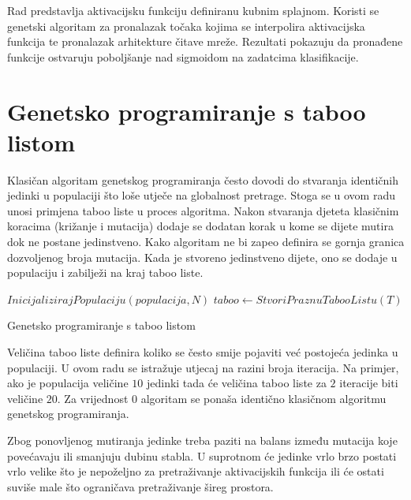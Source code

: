 \documentclass[times, utf8, numeric, diplomski]{fer}
\begin{document}
Rad \citet{cube_spline_func} predstavlja aktivacijsku funkciju definiranu kubnim splajnom. Koristi se genetski algoritam za pronalazak točaka kojima se interpolira aktivacijska funkcija te pronalazak arhitekture čitave mreže. Rezultati pokazuju da pronađene funkcije ostvaruju poboljšanje nad sigmoidom na zadatcima klasifikacije.

\section{Genetsko programiranje s taboo listom}
Klasičan algoritam genetskog programiranja često dovodi do stvaranja identičnih jedinki u populaciji što loše utječe na globalnost pretrage. Stoga se u ovom radu unosi primjena taboo liste u proces algoritma. Nakon stvaranja djeteta klasičnim koracima (križanje i mutacija) dodaje se dodatan korak u kome se dijete mutira dok ne postane jedinstveno. Kako algoritam ne bi zapeo definira se gornja granica dozvoljenog broja mutacija. Kada je stvoreno jedinstveno dijete, ono se dodaje u populaciju i zabilježi na kraj taboo liste.
\newline
\newline
\begin{algorithm}[H]
\DontPrintSemicolon
{}
$InicijalizirajPopulaciju(populacija, N)$ \;
$taboo \gets StvoriPraznuTabooListu(T)$ \;
\;
\caption{Genetsko programiranje s taboo listom}
\label{alg:gp_taboo}
\end{algorithm}

Veličina taboo liste definira koliko se često smije pojaviti već postojeća jedinka u populaciji. U ovom radu se istražuje utjecaj na razini broja iteracija. Na primjer, ako je populacija veličine $10$ jedinki tada će veličina taboo liste za $2$ iteracije biti veličine $20$. Za vrijednost $0$ algoritam se ponaša identično klasičnom algoritmu genetskog programiranja.

Zbog ponovljenog mutiranja jedinke treba paziti na balans između mutacija koje povećavaju ili smanjuju dubinu stabla. U suprotnom će jedinke vrlo brzo postati vrlo velike što je nepoželjno za pretraživanje aktivacijskih funkcija \citep{swish} ili će ostati suviše male što ograničava pretraživanje šireg prostora.
\end{document}
